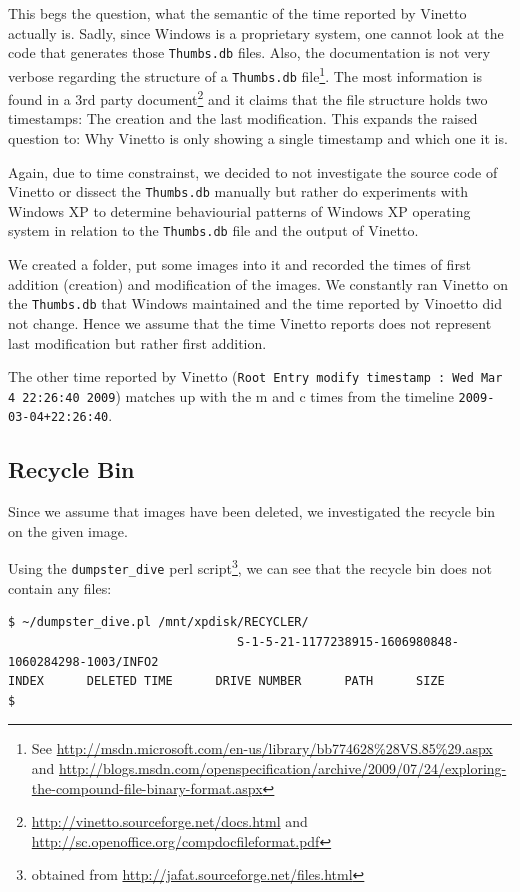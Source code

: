 \documentclass[a4paper,
    11pt,
    normalheadings,
    parindent,
    UKenglish,
    abstracton,
    ]{scrartcl}
\begin{document}
This begs the question, what the semantic of the time reported by Vinetto actually is.
Sadly, since Windows is a proprietary system, one cannot look at the code that generates those \texttt{Thumbs.db} files.
Also, the documentation is not very verbose regarding the structure of a \texttt{Thumbs.db} file\footnote{See \url{http://msdn.microsoft.com/en-us/library/bb774628\%28VS.85\%29.aspx} and \url{http://blogs.msdn.com/openspecification/archive/2009/07/24/exploring-the-compound-file-binary-format.aspx}}.
The most information is found in a 3rd party document\footnote{\url{http://vinetto.sourceforge.net/docs.html} and \url{http://sc.openoffice.org/compdocfileformat.pdf}} and it claims that the file structure holds two timestamps: The creation and the last modification.
This expands the raised question to: Why Vinetto is only showing a single timestamp and which one it is.

Again, due to time constrainst, we decided to not investigate the source code of Vinetto or dissect the \texttt{Thumbs.db} manually
 but rather do experiments with Windows XP to determine behaviourial patterns of Windows XP operating system in relation to the \texttt{Thumbs.db} file and the output of Vinetto.


We created a folder, put some images into it and recorded the times of first addition (creation) and modification of the images.
We constantly ran Vinetto on the \texttt{Thumbs.db} that Windows maintained and the time reported by Vinoetto did not change.
Hence we assume that the time Vinetto reports does not represent last modification but rather first addition.

The other time reported by Vinetto ({\tt Root Entry modify timestamp : Wed Mar  4 22:26:40 2009}) matches up with the m and c times from the timeline {\tt 2009-03-04+22:26:40}.








\subsection{Recycle Bin}

Since we assume that images have been deleted, we investigated the recycle bin on the given image.

Using the {\tt dumpster\_dive} perl script\footnote{obtained from \url{http://jafat.sourceforge.net/files.html}}, we can see that the recycle bin does not contain any files:
\begin{verbatim}
$ ~/dumpster_dive.pl /mnt/xpdisk/RECYCLER/
                                S-1-5-21-1177238915-1606980848-1060284298-1003/INFO2
INDEX      DELETED TIME      DRIVE NUMBER      PATH      SIZE
$
\end{verbatim}
\end{document}
